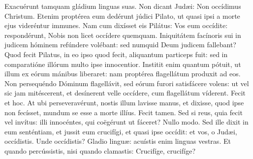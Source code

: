 
Exacuérunt tamquam gládium linguas suas. Non dicant Judæi: Non occídimus Christum. Etenim proptérea eum dedérunt júdici Pilato, ut quasi ipsi a morte ejus videréntur immunes. Nam cum dixísset eis Pilátus: Vos eum occídite: respondérunt, Nobis non licet occídere quemquam. Iniquitátem facínoris sui in judicem hóminem refúndere volébant: sed numquid Deum judicem fallebant? Quod fecit Pilatus, in eo ipso quod fecit, aliquantum particeps fuit: sed in comparatióne illórum multo ipse innocentior. Institit enim quantum pótuit, ut illum ex eórum mánibus liberaret: nam proptérea flagellátum produxit ad eos. Non persequéndo Dóminum flagellávit, sed eórum furori satisfácere volens: ut vel sic jam mitéscerent, et desínerent velle occídere, cum flagellátum víderent. Fecit et hoc. At ubi perseveravérunt, nostis illum lavisse manus, et dixisse, quod ipse non fecísset, mundum se esse a morte illíus. Fecit tamen. Sed si reus, quia fecit vel invítus: illi innocéntes, qui coëgérunt ut fáceret? Nullo modo. Sed ille dixit in eum senténtiam, et jussit eum crucifígi, et quasi ipse occídit: et vos, o Judæi, occídistis. Unde occídistis? Gladio linguæ: acuístis enim linguas vestras. Et quando percússistis, nisi quando clamastis: Crucifíge, crucifíge?
\par
